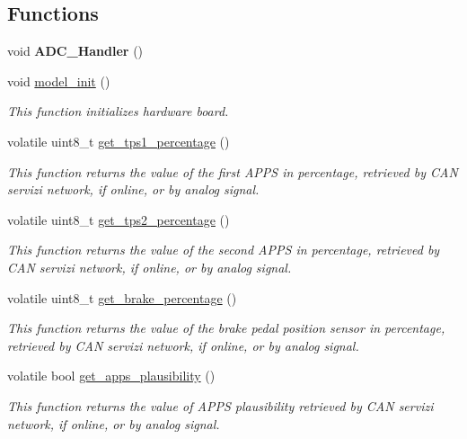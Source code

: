 \subsection*{Functions}
\begin{DoxyCompactItemize}
\item 
\hypertarget{group___board__model__group_gaedc241164d501dcbc52cde232333c9cf}{void {\bfseries A\-D\-C\-\_\-\-Handler} ()}\label{group___board__model__group_gaedc241164d501dcbc52cde232333c9cf}

\item 
void \hyperlink{group___board__model__group_gace5a444da39d4366693503c53f0841c2}{model\-\_\-init} ()
\begin{DoxyCompactList}\small\item\em This function initializes hardware board. \end{DoxyCompactList}\item 
volatile uint8\-\_\-t \hyperlink{group___board__model__group_ga9239a95f68fab3d9b6832fbe85eb87cd}{get\-\_\-tps1\-\_\-percentage} ()
\begin{DoxyCompactList}\small\item\em This function returns the value of the first A\-P\-P\-S in percentage, retrieved by C\-A\-N servizi network, if online, or by analog signal. \end{DoxyCompactList}\item 
volatile uint8\-\_\-t \hyperlink{group___board__model__group_gae563bbe9e3c31913df498ebd7cbf6c10}{get\-\_\-tps2\-\_\-percentage} ()
\begin{DoxyCompactList}\small\item\em This function returns the value of the second A\-P\-P\-S in percentage, retrieved by C\-A\-N servizi network, if online, or by analog signal. \end{DoxyCompactList}\item 
volatile uint8\-\_\-t \hyperlink{group___board__model__group_ga6db41e7368919bc4dfafaf4e400ae1a9}{get\-\_\-brake\-\_\-percentage} ()
\begin{DoxyCompactList}\small\item\em This function returns the value of the brake pedal position sensor in percentage, retrieved by C\-A\-N servizi network, if online, or by analog signal. \end{DoxyCompactList}\item 
volatile bool \hyperlink{group___board__model__group_gae0acabf32ee7f2a82b2f9149ba3d1978}{get\-\_\-apps\-\_\-plausibility} ()
\begin{DoxyCompactList}\small\item\em This function returns the value of A\-P\-P\-S plausibility retrieved by C\-A\-N servizi network, if online, or by analog signal. \end{DoxyCompactList}\item 

\end{DoxyCompactItemize}
